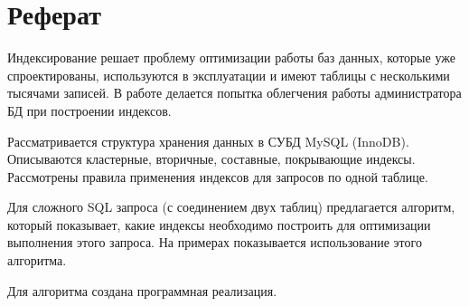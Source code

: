 \chapter{Реферат}

Индексирование решает проблему оптимизации работы баз данных, которые уже спроектированы, используются в эксплуатации и имеют таблицы с несколькими тысячами записей. В работе делается попытка облегчения работы администратора БД при построении индексов. 

Рассматривается структура хранения данных в СУБД MySQL (InnoDB). Описываются кластерные, вторичные, составные, покрывающие индексы. Рассмотрены правила применения индексов для запросов по одной таблице. 

Для сложного SQL запроса (с соединением двух таблиц) предлагается алгоритм, который показывает, какие индексы необходимо построить для оптимизации выполнения этого запроса. На примерах показывается использование этого алгоритма. 

Для алгоритма создана программная реализация.